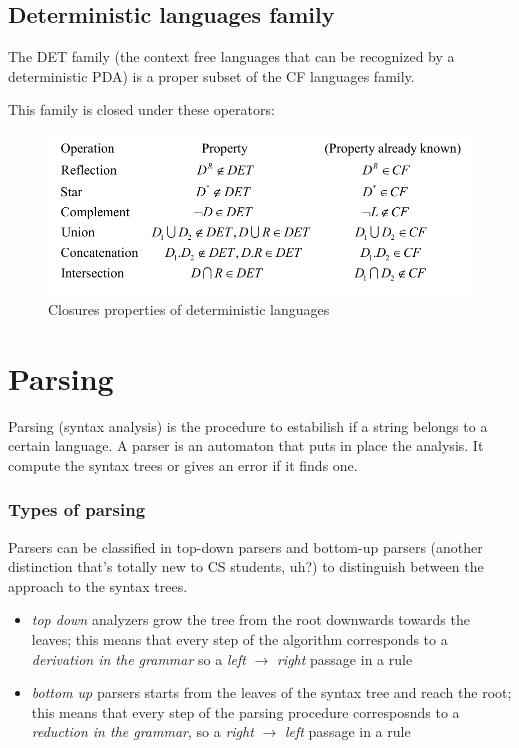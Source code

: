 		\subsection{Deterministic languages family}
			The DET family (the context free languages that can be recognized by a deterministic PDA) is a proper subset of the CF languages family.

			This family is closed under these operators:
			\begin{figure}[htp]
				\begin{center}
					\includegraphics[width = \textwidth]{./images/detClosures.png}
					\caption{Closures properties of deterministic languages}
				\end{center}
			\end{figure}
	
	\section{Parsing}
		Parsing (syntax analysis) is the procedure to estabilish if a string belongs to a certain language. A parser is an automaton that puts in place the analysis. 
		It compute the syntax trees or gives an error if it finds one.
		
		\subsubsection{Types of parsing}
			Parsers can be classified in top-down parsers and bottom-up parsers (another distinction that's totally new to CS students, uh?) to distinguish between 
			the approach to the syntax trees.
			\begin{itemize}
				\item \emph{top down} analyzers grow the tree from the root downwards towards the leaves; this means that every step of the algorithm corresponds to 
				a \emph{derivation in the grammar} so a \emph{left} $\rightarrow$ \emph{right} passage in a rule
				\item \emph{bottom up} parsers starts from the leaves of the syntax tree and reach the root; this means that every step of the parsing procedure 
				corresposnds to a \emph{reduction in the grammar}, so a \emph{right} $\rightarrow$ \emph{left} passage in a rule
			\end{itemize}
		
